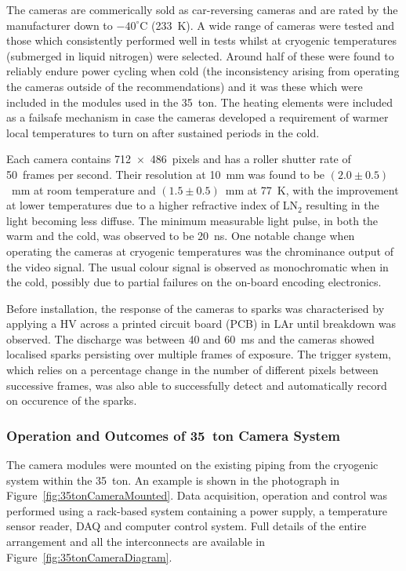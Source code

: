 The cameras are commerically sold as car-reversing cameras and are rated by the manufacturer down to $-40^{\circ}$C (233~K).  A wide range of cameras were tested and those which consistently performed well in tests whilst at cryogenic temperatures (submerged in liquid nitrogen) were selected.  Around half of these were found to reliably endure power cycling when cold (the inconsistency arising from operating the cameras outside of the recommendations) and it was these which were included in the modules used in the 35~ton.  The heating elements were included as a failsafe mechanism in case the cameras developed a requirement of warmer local temperatures to turn on after sustained periods in the cold.

Each camera contains 712~$\times$~486~pixels and has a roller shutter rate of 50~frames per second.  Their resolution at 10~mm was found to be $(2.0\pm0.5)$~mm at room temperature and $(1.5\pm0.5)$~mm at 77~K, with the improvement at lower temperatures due to a higher refractive index of LN$_2$ resulting in the light becoming less diffuse.  The minimum measurable light pulse, in both the warm and the cold, was observed to be 20~ns.  One notable change when operating the cameras at cryogenic temperatures was the chrominance output of the video signal.  The usual colour signal is observed as monochromatic when in the cold, possibly due to partial failures on the on-board encoding electronics.

Before installation, the response of the cameras to sparks was characterised by applying a HV across a printed circuit board (PCB) in LAr until breakdown was observed.  The discharge was between 40 and 60~ms and the cameras showed localised sparks persisting over multiple frames of exposure.  The trigger system, which relies on a percentage change in the number of different pixels between successive frames, was also able to successfully detect and automatically record on occurence of the sparks.

\subsubsection{Operation and Outcomes of 35~ton Camera System}\label{sec:35tonCameraSystemOperation}

The camera modules were mounted on the existing piping from the cryogenic system within the 35~ton.  An example is shown in the photograph in Figure~\ref{fig:35tonCameraMounted}.  Data acquisition, operation and control was performed using a rack-based system containing a power supply, a temperature sensor reader, DAQ and computer control system.  Full details of the entire arrangement and all the interconnects are available in Figure~\ref{fig:35tonCameraDiagram}.

